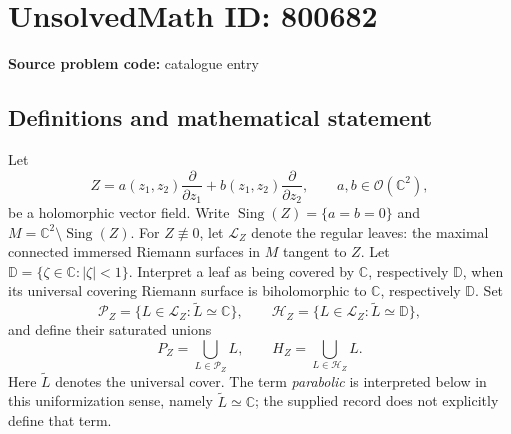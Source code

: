 \documentclass[11pt]{article}
\newcommand{\C}{\mathbb{C}}
\begin{document}
\section*{UnsolvedMath ID: 800682}
\textbf{Source problem code:} catalogue entry
\subsection{Definitions and mathematical statement}
Let
\[
Z=a(z_1,z_2)\frac{\partial}{\partial z_1}+b(z_1,z_2)\frac{\partial}{\partial z_2},\qquad a,b\in\mathcal O(\C^2),
\]
be a holomorphic vector field. Write \(\operatorname{Sing}(Z)=\{a=b=0\}\) and \(M=\C^2\setminus\operatorname{Sing}(Z)\). For \(Z\not\equiv0\), let \(\mathcal L_Z\) denote the regular leaves: the maximal connected immersed Riemann surfaces in \(M\) tangent to \(Z\). Let \(\mathbb D=\{\zeta\in\C:|\zeta|<1\}\). Interpret a leaf as being covered by \(\C\), respectively \(\mathbb D\), when its universal covering Riemann surface is biholomorphic to \(\C\), respectively \(\mathbb D\). Set
\[
\mathcal P_Z=\{L\in\mathcal L_Z:\widetilde L\simeq\C\},\qquad
\mathcal H_Z=\{L\in\mathcal L_Z:\widetilde L\simeq\mathbb D\},
\]
and define their saturated unions
\[
P_Z=\bigcup_{L\in\mathcal P_Z}L,\qquad H_Z=\bigcup_{L\in\mathcal H_Z}L.
\]
Here \(\widetilde L\) denotes the universal cover. The term \emph{parabolic} is interpreted below in this uniformization sense, namely \(\widetilde L\simeq\C\); the supplied record does not explicitly define that term.
\end{document}
